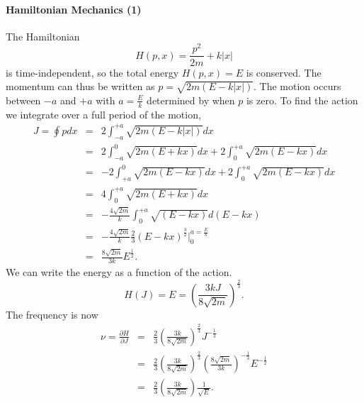 \documentclass[letterpaper,11pt]{article}
\begin{document}
\paragraph*{Hamiltonian Mechanics (1)}
The Hamiltonian
\begin{equation*}
 H(p,x) = \frac{p^2}{2m} + k|x|
\end{equation*}
is time-independent, so the total energy $H(p,x) = E$ is conserved.  The momentum can thus be written as $p = \sqrt{2m \left(E - k|x|\right)}$.
The motion occurs between $-a$ and $+a$ with $a = \frac{E}{k}$ determined by when $p$ is zero.  To find the action we integrate over a full period of the motion,
\begin{eqnarray*}
 J = \oint p dx & = & 2 \int_{-a}^{+a} \sqrt{2m \left(E - k|x|\right)} dx \\
 & = & 2 \int_{-a}^0 \sqrt{2m \left(E + k x\right)} dx + 2 \int_0^{+a} \sqrt{2m \left(E - k x\right)} dx \\
 & = & - 2 \int_{+a}^0 \sqrt{2m \left(E - k x\right)} dx + 2 \int_0^{+a} \sqrt{2m \left(E - k x\right)} dx \\
 & = & 4 \int_0^{+a} \sqrt{2m \left(E + k x\right)} dx \\
 & = & - \frac{4\sqrt{2m}}{k} \int_0^{+a} \sqrt{\left(E - k x\right)} d(E - k x) \\
 & = & - \frac{4\sqrt{2m}}{k} \frac{2}{3} \left(E - k x\right)^\frac{3}{2}|_0^{a = \frac{E}{k}} \\
 & = & \frac{8\sqrt{2m}}{3k} E^\frac{1}{2}.
\end{eqnarray*}
We can write the energy as a function of the action.
\begin{equation*}
 H(J) = E = \left(\frac{3kJ}{8\sqrt{2m}}\right)^\frac{2}{3}.
\end{equation*}
The frequency is now
\begin{eqnarray*}
 \nu = \frac{\partial H}{\partial J} & = & \frac{2}{3} \left(\frac{3k}{8\sqrt{2m}}\right)^\frac{2}{3} J^{-\frac{1}{3}} \\
 & = & \frac{2}{3} \left(\frac{3k}{8\sqrt{2m}}\right)^\frac{2}{3} \left(\frac{8\sqrt{2m}}{3k}\right)^{-\frac{1}{3}} E^{-\frac{1}{2}} \\
 & = & \frac{2}{3} \left(\frac{3k}{8\sqrt{2m}}\right) \frac{1}{\sqrt{E}}.
\end{eqnarray*}
\end{document}

